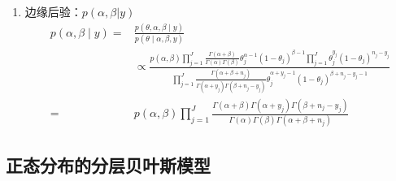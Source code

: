 \begin{enumerate}
\item
  边缘后验：\(p(\alpha,\beta|y)\)
\begin{equation}
  \begin{aligned}
    p(\alpha, \beta \mid y)
    =& \frac{p(\theta, \alpha, \beta \mid y)}{p(\theta \mid \alpha, \beta, y)} \\
    &\propto \frac{p(\alpha, \beta) \prod_{j=1}^{J} 
    \frac{\Gamma(\alpha+\beta)}{\Gamma(\alpha) \Gamma(\beta)} 
    \theta_{j}^{\alpha-1}\left(1-\theta_{j}\right)^{\beta-1} \prod_{j=1}^{J} \theta_{j}^{y_{j}}\left(1-\theta_{j}\right)^{n_{j}-y_{j}}}{\prod_{j=1}^{J} 
    \frac{\Gamma\left(\alpha+\beta+n_{j}\right)}{\Gamma\left(\alpha+y_{j}\right) \Gamma\left(\beta+n_{j}-y_{j}\right)} 
    \theta_{j}^{\alpha+y_{j}-1}\left(1-\theta_{j}\right)^{\beta+n_{j}-y_{j}-1}} \\
    =& p(\alpha, \beta) \prod_{j=1}^{J} \frac{\Gamma(\alpha+\beta) \Gamma\left(\alpha+y_{j}\right) 
    \Gamma\left(\beta+n_{j}-y_{j}\right)}{\Gamma(\alpha) \Gamma(\beta) \Gamma\left(\alpha+\beta+n_{j}\right)}
    \end{aligned}
\end{equation}

\end{enumerate}


\subsection{正态分布的分层贝叶斯模型}

